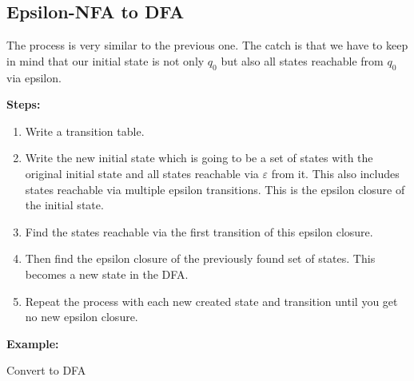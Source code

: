 \subsection{Epsilon-NFA to DFA}

The process is very similar to the previous one. The catch is that we have to keep in mind that 
our initial state is not only \(q_0\) but also all states reachable from \(q_0\) via epsilon.

\textbf{Steps:}

\begin{enumerate}
    
    \item Write a transition table.
    
    \item Write the new initial state which is going to be a set of states with the 
          original initial state and all states reachable via \(\varepsilon\) from it. This 
          also includes states reachable via multiple epsilon transitions. 
          This is the epsilon closure of the initial state.

    \item Find the states reachable via the first transition of this epsilon closure.
    
    \item Then find the epsilon closure of the previously found set of states. This becomes a new state 
          in the DFA.  

    \item Repeat the process with each new created state and transition until you get no new epsilon 
          closure.

\end{enumerate}

\textbf{Example:} 

Convert to DFA

\begin{figure}[H]
\centering
{}
\end{figure}

